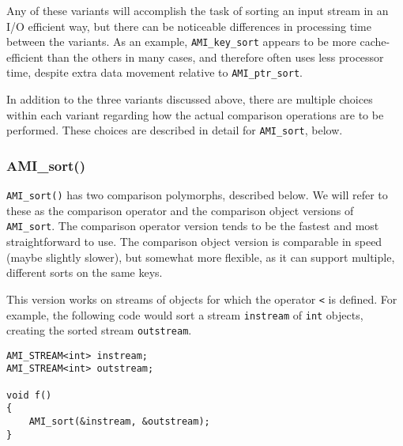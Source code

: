 Any of these variants will accomplish the task of sorting an input
stream in an I/O efficient way, but there can be noticeable
differences in processing time between the variants. As an
example,
\lstinline|AMI_key_sort| appears to be more cache-efficient than the
others in many cases, and therefore often uses less processor time,
despite extra data movement relative to \lstinline|AMI_ptr_sort|.

In addition to the three variants discussed above, there are multiple
choices within each variant regarding how the actual comparison
operations are to be performed. These choices are described in detail
for \lstinline|AMI_sort|, below.


\subsubsection{AMI\_sort()}
\lstinline|AMI_sort()| has two comparison polymorphs, described
below. We
will refer to these as the comparison operator and the comparison
object versions of \lstinline|AMI_sort|. The comparison operator
version tends to be the fastest and most straightforward to use. The
comparison object version is comparable in speed (maybe slightly
slower), but somewhat more flexible, as it can support multiple,
different sorts on the same keys.

\vspace*{\baselineskip}

 This version works on streams of
objects for which the operator \lstinline|<| is defined. For example,
the following code would sort a stream \lstinline|instream| of
\lstinline|int| objects, creating the sorted stream
\lstinline|outstream|.

\begin{lstlisting}
AMI_STREAM<int> instream;
AMI_STREAM<int> outstream;

void f()
{
    AMI_sort(&instream, &outstream);
}
\end{lstlisting}



